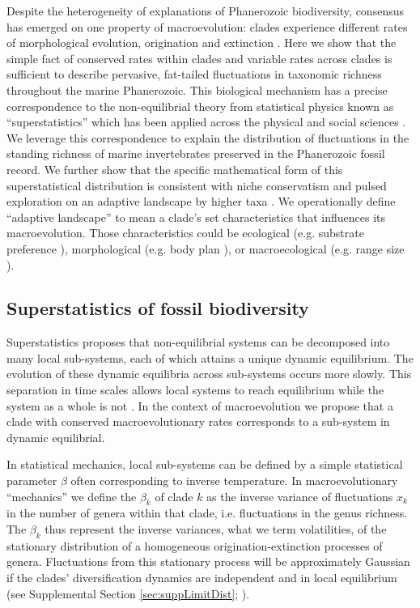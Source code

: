 \documentclass[12pt]{article}
\let\citep=\cite
\begin{document}
Despite the heterogeneity of explanations of Phanerozoic biodiversity,
consensus has emerged on one property of macroevolution: clades
experience different rates of morphological evolution, origination and
extinction \citep{simpson1953, sepkoski1984, holman1989, gilinsky1994,
  stadler2011, rabosky2014}. Here we show that the simple fact of
conserved rates within clades and variable rates across clades is
sufficient to describe pervasive, fat-tailed fluctuations in taxonomic
richness throughout the marine Phanerozoic.  This biological mechanism
has a precise correspondence to the non-equilibrial theory from
statistical physics known as ``superstatistics'' \citep{beck2003}
which has been applied across the physical and social sciences
\citep{beck2004, fuentes2009}. We leverage this correspondence to
explain the distribution of fluctuations in the standing richness of
marine invertebrates preserved in the Phanerozoic fossil record. We
further show that the specific mathematical form of this
superstatistical distribution is consistent with niche conservatism
\citep{roy2009range, hopkins2014} and pulsed exploration on an
adaptive landscape by higher taxa \citep{eldredgeGould1972,
  newman1985adaptive, hopkins2014}. We operationally define ``adaptive
landscape'' to mean a clade's set characteristics that influences its
macroevolution. Those characteristics could be ecological (e.g.
substrate preference \citep{bambach1983, bush2007, hopkins2014}),
morphological (e.g. body plan \citep{erwin2012}), or macroecological
(e.g. range size \citep{harnik2011, foote2008paleobiol}).


\subsection{Superstatistics of fossil biodiversity}

Superstatistics \citep{beck2003} proposes that non-equilibrial systems
can be decomposed into many local sub-systems, each of which attains a
unique dynamic equilibrium. The evolution of these dynamic equilibria
across sub-systems occurs more slowly. This separation in time scales
allows local systems to reach equilibrium while the system as a whole
is not \citep{beck2003}.  In the context of macroevolution we propose
that a clade with conserved macroevolutionary rates corresponds to a
sub-system in dynamic equilibrial.

In statistical mechanics, local sub-systems can be defined by a simple
statistical parameter $\beta$ often corresponding to inverse
temperature. In macroevolutionary ``mechanics'' we define the
$\beta_k$ of clade $k$ as the inverse variance of fluctuations $x_k$
in the number of genera within that clade, i.e. fluctuations in the
genus richness.  The $\beta_k$ thus represent the inverse variances,
what we term volatilities, of the stationary distribution of a
homogeneous origination-extinction processes of genera. Fluctuations
from this stationary process will be approximately Gaussian if the
clades' diversification dynamics are independent and in local
equilibrium (see Supplemental Section \ref{sec:suppLimitDist};
\citep{keilson1970, grassmann1987}).
\end{document}

